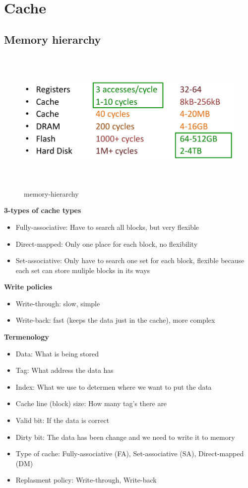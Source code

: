 \newpage


\section{Cache}
\subsection{Memory hierarchy}

\begin{figure}[h]
    \vspace{10mm}
    \centering
    \includegraphics[width=16cm, height=7cm]{image/memory-hierarchy.png}
    \caption{memory-hierarchy}
\end{figure}

\textbf{3-types of cache types}
\begin{itemize}
\item  Fully-associative: Have to search all blocks, but very flexible 
\item  Direct-mapped: Only one place for each block, no flexibility
\item  Set-associative: Only have to search one set for each block,
  flexible because each set can store muliple blocks in its ways 
\end{itemize}

\textbf{Write policies}
\begin{itemize}
\item  Write-through: slow, simple 
\item  Write-back: fast (keeps the data just in the cache), more complex
\end{itemize}

\textbf{Termenology}
\begin{itemize}
\item  Data: What is being stored
\item  Tag: What address the data has
\item  Index: What we use to determen where we want to put the data
\item  Cache line (block) size: How many tag's there are
\item  Valid bit: If the data is correct
\item  Dirty bit: The data has been change and we need to write it to memory
\item  Type of cache: Fully-associative (FA), Set-associative (SA), Direct-mapped (DM)
\item  Replasment policy: Write-through, Write-back  
\end{itemize}


